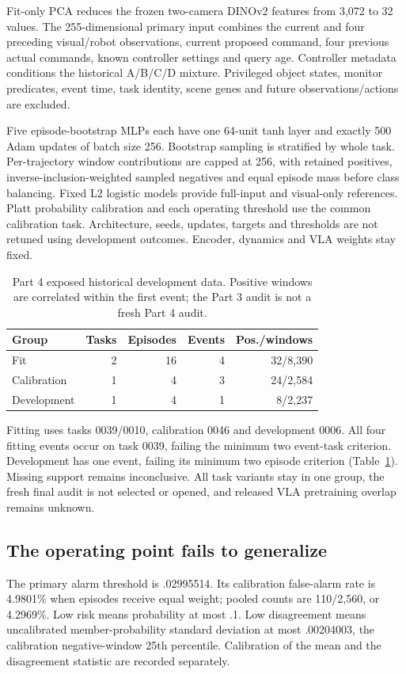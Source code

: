 Fit-only PCA reduces the frozen two-camera DINOv2 features from 3,072 to 32 values.
The 255-dimensional primary input combines the current and four preceding
visual/robot observations, current proposed command, four previous actual commands,
known controller settings and query age. Controller metadata conditions the
historical A/B/C/D mixture. Privileged object states, monitor predicates, event time,
task identity, scene genes and future observations/actions are excluded.

Five episode-bootstrap MLPs each have one 64-unit tanh layer and exactly 500 Adam
updates of batch size 256. Bootstrap sampling is stratified by whole task.
Per-trajectory window contributions are capped at 256, with retained positives,
inverse-inclusion-weighted sampled negatives and equal episode mass before class
balancing. Fixed L2 logistic models provide full-input and visual-only references.
Platt probability calibration and each operating threshold use the common
calibration task. Architecture, seeds, updates, targets and thresholds are not
retuned using development outcomes. Encoder, dynamics and VLA weights stay fixed.

\begin{table}[t]
\caption{Part 4 exposed historical development data. Positive windows are
correlated within the first event; the Part 3 audit is not a fresh Part 4 audit.}
\label{tab:part4-support}
\begin{tabular}{lrrrr}
\toprule
Group & Tasks & Episodes & Events & Pos./windows \\
\midrule
Fit & 2 & 16 & 4 & 32/8,390 \\
Calibration & 1 & 4 & 3 & 24/2,584 \\
Development & 1 & 4 & 1 & 8/2,237 \\
\bottomrule
\end{tabular}
\end{table}

Fitting uses tasks 0039/0010, calibration 0046 and development 0006. All four
fitting events occur on task 0039, failing the minimum two event-task criterion.
Development has one event, failing its minimum two episode criterion
(Table~\ref{tab:part4-support}). Missing support remains inconclusive. All task
variants stay in one group, the fresh final audit is not selected or opened,
and released VLA pretraining overlap remains unknown.

\subsection{The operating point fails to generalize}
The primary alarm threshold is .02995514. Its calibration false-alarm rate is
4.9801\% when episodes receive equal weight; pooled counts are 110/2,560,
or 4.2969\%. Low risk means probability at most .1. Low disagreement means
uncalibrated member-probability standard deviation at most .00204003, the
calibration negative-window 25th percentile. Calibration of the mean and the
disagreement statistic are recorded separately.

